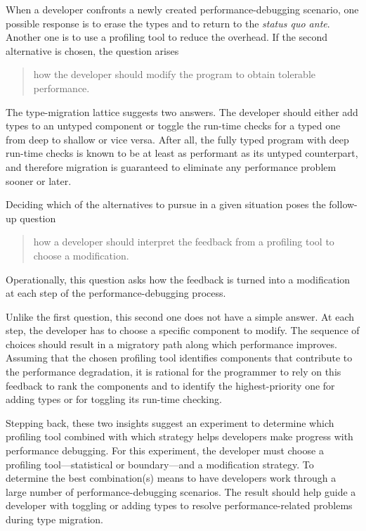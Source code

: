 
When a developer confronts a newly created performance-debugging scenario, one
possible response is to erase the types and to return to the {\em status quo
ante\/}.  Another one is to use a profiling tool to reduce the overhead. If the
second alternative is chosen, the question arises 
\begin{quote} \em

 how the developer should modify the program to obtain tolerable performance.
 
\end{quote}   
The type-migration lattice suggests two answers.  The developer should either
add types to an untyped component or toggle the run-time checks for a typed one
from deep to shallow or vice versa.  After all, the fully typed program with
deep run-time checks is known to be at least as performant as its untyped
counterpart, and therefore migration is guaranteed to eliminate any performance
problem sooner or later.

Deciding which of the alternatives to pursue in a given situation poses the
follow-up question 
\begin{quote} \em

how a developer should interpret the feedback from a profiling tool to
choose a modification.

\end{quote}   
Operationally, this question asks how the feedback is turned into a
modification at each step of the performance-debugging process.

Unlike the first question, this second one does not have a simple answer.  At
each step, the developer has to choose a specific component to modify.  The
sequence of choices should result in a migratory path along which performance
improves. Assuming that the chosen profiling tool identifies components that
contribute to the performance degradation, it is rational for the programmer to
rely on this feedback to rank the components and to identify the
highest-priority one for adding types or for toggling its run-time checking.

Stepping back, these two insights suggest an experiment to determine which
profiling tool combined with which strategy helps developers make progress with
performance debugging. For this experiment, the developer must choose a
profiling tool---statistical or boundary---and a modification strategy.
To determine the best combination(s) means to have developers work through a
large number of performance-debugging scenarios. The result should help guide a
developer with toggling or adding types to resolve performance-related
problems during type migration.

